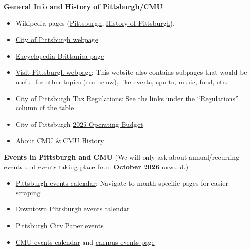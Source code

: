 \documentclass[11pt]{article}
\begin{document}
\vspace{0.4em}
\noindent\textbf{General Info and History of Pittsburgh/CMU}
\begin{itemize}[nosep, leftmargin=2em]
  \item Wikipedia pages (\href{https://en.wikipedia.org/wiki/Pittsburgh}{Pittsburgh},
    \href{https://en.wikipedia.org/wiki/History_of_Pittsburgh}{History of Pittsburgh}).
  \item \href{https://www.pittsburghpa.gov/Home}{City of Pittsburgh webpage}
  \item \href{https://www.britannica.com/place/Pittsburgh}{Encyclopedia Brittanica page}
  \item \href{https://www.visitpittsburgh.com}{Visit Pittsburgh webpage}: This website also contains
    subpages that would be useful for other topics (see below), like events, sports, music, food, etc.
  \item City of Pittsburgh \href{https://pittsburghpa.gov/finance/tax-forms}{Tax Regulations}: See the
    links under the ``Regulations'' column of the table
  \item City of Pittsburgh
    \href{https://www.pittsburghpa.gov/files/assets/city/v/4/omb/documents/operating-budgets/2025-operating-budget.pdf}{2025
    Operating Budget}
  \item \href{https://www.cmu.edu/about/}{About CMU \& CMU History}
\end{itemize}

\vspace{0.4em}
\noindent\textbf{Events in Pittsburgh and CMU} (We will only ask about annual/recurring events and
events taking place from \textbf{October 2026} onward.)
\begin{itemize}[nosep, leftmargin=2em]
  \item \href{https://pittsburgh.events}{Pittsburgh events calendar}: Navigate to month-specific pages
    for easier scraping
  \item \href{https://downtownpittsburgh.com/events/}{Downtown Pittsburgh events calendar}
  \item \href{https://www.pghcitypaper.com/pittsburgh/EventSearch?v=d}{Pittsburgh City Paper events}
  \item \href{https://events.cmu.edu}{CMU events calendar} and
    \href{https://www.cmu.edu/engage/alumni/events/campus/index.html}{campus events page}
\end{itemize}
\end{document}
